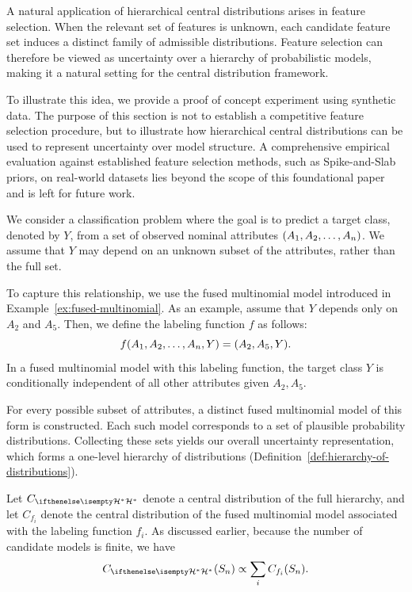 A natural application of hierarchical central distributions arises in feature selection.
When the relevant set of features is unknown, each candidate feature set induces a distinct family of admissible
distributions.
Feature selection can therefore be viewed as uncertainty over a hierarchy of probabilistic models, making it a
natural setting for the central distribution framework.

To illustrate this idea, we provide a proof of concept experiment using synthetic data.
The purpose of this section is not to establish a competitive feature selection procedure, but to illustrate how
hierarchical central distributions can be used to represent uncertainty over model structure.
A comprehensive empirical evaluation against established feature selection methods, such as Spike-and-Slab priors,
on real-world datasets lies beyond the scope of this foundational paper and is left for future work.

We consider a classification problem where the goal is to
predict a target class, denoted by $Y$, from a set of observed nominal attributes $(A_1, A_2, \ldots, A_{n})$.
We assume that $Y$ may depend on an unknown subset of the attributes, rather than the full set.

To capture this relationship, we use the fused multinomial model introduced in Example~\ref{ex:fused-multinomial}.
As an example, assume that $Y$ depends only on $A_2$ and $A_5$.
Then, we define the labeling function $f$ as follows:
\[
    f(A_1, A_2, \ldots, A_{n}, Y) = (A_2, A_5, Y).
\]
In a fused multinomial model with this labeling function, the target class $Y$ is conditionally independent of
all other attributes given $A_2, A_5$.

For every possible subset of attributes, a distinct fused multinomial model of this form is constructed.
Each such model corresponds to a set of plausible probability distributions.
Collecting these sets yields our overall uncertainty representation, which forms a one-level
hierarchy of distributions (Definition~\ref{def:hierarchy-of-distributions}).

Let $C_{\setQQ}$ denote a central distribution of the full hierarchy, and let $C_{f_i}$ denote the central
distribution of the fused multinomial model associated with the labeling function $f_i$.
As discussed earlier, because the number of candidate models is finite, we have
\begin{equation}\label{eq:att-select-central}
    C_{\setQQ}(S_n) \propto \sum_i C_{f_i}(S_n).
\end{equation}

